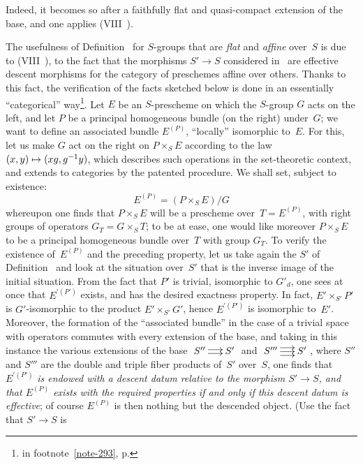 Indeed, it becomes so after a faithfully flat and
quasi-compact extension of the base, and one applies (VIII~).

The usefulness of Definition~ for $S$-groups that are
\emph{flat} and \emph{affine} over~$S$ is due to
(VIII~), \ie to the fact that the morphisms $S'\to S$
considered in~ are effective descent morphisms
for the category of preschemes affine over
others. Thanks to this fact, the verification of the facts
sketched below is done in an essentially
``categorical'' way\footnote{\Cf \loccit in
footnote~\eqref{note-293}, p\ptbl\pageref{note-293}.}. Let $E$ be an $S$-prescheme on which the
$S$-group $G$ acts on the left, and let $P$ be a principal
homogeneous bundle (on the right) under~$G$; we want to
define an associated bundle $E^{(P)}$, ``locally''
isomorphic to~$E$. For this, let us make $G$ act
on the right on $P\times_S E$ according to the law $(x,y)\mto
(xg,g^{-1}y)$, which describes such operations in the
set-theoretic context, and extends to categories by the
patented procedure. We shall set, subject to existence:
$$
E^{(P)}=(P\times_S E)/G
$$
whereupon one finds that $P\times_S E$ will be a prescheme
over~$T=E^{(P)}$, with right groups of operators
$G_T=G\times_S T$; to be at ease, one would like moreover
$P\times_S E$ to be a principal homogeneous bundle over~$T$ with
group $G_T$. To verify the existence of~$E^{(P)}$ and the
preceding property, let us take again the $S'$ of
Definition~ and look at the situation over~$S'$
that is the inverse image of the initial situation. From the fact that $P'$ is
trivial,
\ie isomorphic to $G'_d$, one sees at once that $E^{\prime(P')}$
exists, and has the desired exactness property. In fact,
$E'\times_{S'} P'$ is $G'$-isomorphic to the product $E'\times_{S'} G'$,
hence $E^{\prime(P')}$ is isomorphic to~$E'$. Moreover, the formation of the
``associated bundle'' in the case of a trivial space with operators
commutes with every extension of the base, and taking in this
instance the various extensions of the base
$\xymatrix@C=.5cm{S''\ar@<2pt>[r]\ar@<-2pt>[r]&S'}$
and
$\xymatrix@C=.5cm{S'''\ar@<4pt>[r]\ar@<0pt>[r]\ar@<-4pt>[r]&S'}$, where
$S''$ and $S'''$ are the double and triple fiber products of~$S'$
over~$S$, one finds that $E^{\prime(P')}$ \emph{is endowed with a descent
datum relative to the morphism $S'\to S$, and that $E^{(P)}$
exists with the required properties if and only if this
descent datum is effective}; of course $E^{(P)}$ is then
nothing but the descended object. (Use the fact that $S'\to S$ is
